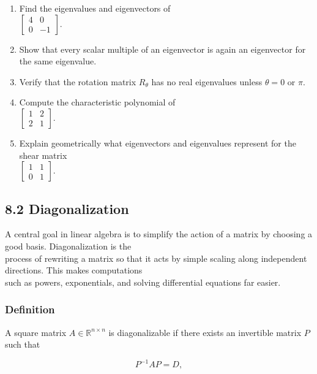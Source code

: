 \documentclass[
  12pt,
  a4paper,
]{article}
\begin{document}
\begin{enumerate}
\def\labelenumi{\arabic{enumi}.}
\item
  Find the eigenvalues and eigenvectors of\\
  \(\begin{bmatrix} 4 & 0 \\ 0 & -1 \end{bmatrix}\).
\item
  Show that every scalar multiple of an eigenvector is again an
  eigenvector for the same eigenvalue.
\item
  Verify that the rotation matrix \(R_\theta\) has no real eigenvalues
  unless \(\theta = 0\) or \(\pi\).
\item
  Compute the characteristic polynomial of\\
  \(\begin{bmatrix} 1 & 2 \\ 2 & 1 \end{bmatrix}\).
\item
  Explain geometrically what eigenvectors and eigenvalues represent for
  the shear matrix\\
  \(\begin{bmatrix} 1 & 1 \\ 0 & 1 \end{bmatrix}\).
\end{enumerate}

\subsection{8.2 Diagonalization}\label{82-diagonalization}

A central goal in linear algebra is to simplify the action of a matrix
by choosing a good basis. Diagonalization is the\\
process of rewriting a matrix so that it acts by simple scaling along
independent directions. This makes computations\\
such as powers, exponentials, and solving differential equations far
easier.

\subsubsection{Definition}\label{definition-6}

A square matrix \(A \in \mathbb{R}^{n \times n}\) is diagonalizable if
there exists an invertible matrix \(P\) such that

\[P^{-1} A P = D,\]
\end{document}
